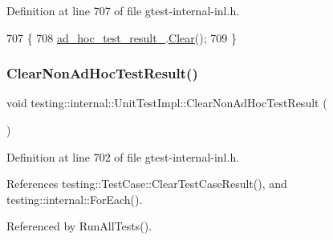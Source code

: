 Definition at line 707 of file gtest-\/internal-\/inl.\+h.


\begin{DoxyCode}
707                               \{
708     \hyperlink{classtesting_1_1internal_1_1UnitTestImpl_a15355228a7140a08f9e2f333aa934ccd}{ad\_hoc\_test\_result\_}.\hyperlink{classtesting_1_1TestResult_a5371bc2e69435b4cb1fdad9ca81759a6}{Clear}();
709   \}
\end{DoxyCode}
\mbox{\label{classtesting_1_1internal_1_1UnitTestImpl_a96c2a5b23541ef01020c402644563ba1}} 
\subsubsection{\texorpdfstring{Clear\+Non\+Ad\+Hoc\+Test\+Result()}{ClearNonAdHocTestResult()}}
{\footnotesize\ttfamily void testing\+::internal\+::\+Unit\+Test\+Impl\+::\+Clear\+Non\+Ad\+Hoc\+Test\+Result (\begin{DoxyParamCaption}{ }\end{DoxyParamCaption})\hspace{0.3cm}{\ttfamily [inline]}}



Definition at line 702 of file gtest-\/internal-\/inl.\+h.



References testing\+::\+Test\+Case\+::\+Clear\+Test\+Case\+Result(), and testing\+::internal\+::\+For\+Each().



Referenced by Run\+All\+Tests().


